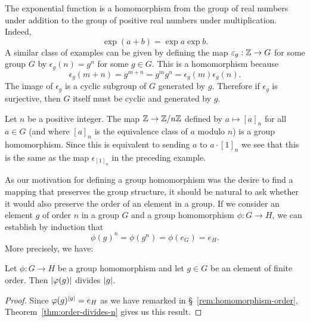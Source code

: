 \begin{example}
    The exponential function is a homomorphism from the group of real numbers
    under addition to the group of positive real numbers under multiplication.
    Indeed,
    \[
        \exp (a + b) = \exp a \exp b.
    \]
    A similar class of examples can be given by defining the map \(\varepsilon_g :
    \mathbb{Z} \to G\) for some group \(G\) by \(\epsilon_g(n) = g^n\) for some \(g \in
    G\). This is a homomorphism because
    \[
        \epsilon_g(m + n) = g^{m + n} = g^m g^n = \epsilon_g(m) \epsilon_g(n).
    \]
    The image of \(\epsilon_g\) is a cyclic subgroup of \(G\) generated by
    \(g\). Therefore if \(\epsilon_g\) is surjective, then \(G\) itself must be
    cyclic and generated by \(g\).
\end{example}

\begin{example}
    Let \(n\) be a positive integer. The map \(\mathbb{Z} \to \mathbb{Z}/n\mathbb{Z}\) defined by \(a
    \mapsto [a]_n\) for all \(a \in G\) (and where \([a]_n\) is the equivalence
    class of \(a\) modulo \(n\)) is a group homomorphism. Since this is
    equivalent to sending \(a\) to \(a \cdot [1]_n\) we see that this is the
    same as the map \(\epsilon_{[1]_n}\) in the preceding example.
\end{example}

\begin{remark}
    \label{rem:homomorphism-order}
    As our motivation for defining a group homomorphism was the desire to find a
    mapping that preserves the group structure, it should be natural to ask
    whether it would also preserve the order of an element in a group. If we
    consider an element \(g\) of order \(n\) in a group \(G\) and a group
    homomorphism \(\phi: G \to H\), we can establish by induction that
    \[
        \phi(g)^n = \phi(g^n) = \phi(e_G) = e_H.
    \]
    More precisely, we have:
\end{remark}

\begin{theorem}
    \label{thm:order-divides-n-homomorphism}
    Let \(\phi: G \to H\) be a group homomorphism and let \(g \in G\) be an
    element of finite order. Then \(\lvert \varphi(g) \rvert\) divides \(\lvert g \rvert\).
\end{theorem}

\begin{proof}
    Since \(\varphi(g)^{\lvert g \rvert} = e_H\) as we have remarked in
    \S~\ref{rem:homomorphism-order}, Theorem~\ref{thm:order-divides-n} gives us
    this result.
\end{proof}


